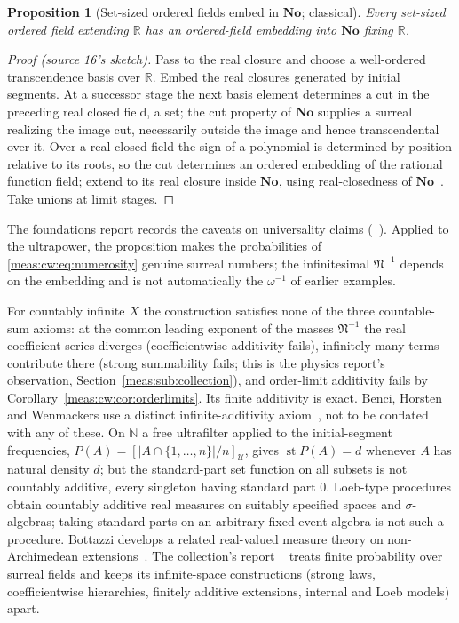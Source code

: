 \documentclass[11pt]{article}
\numberwithin{equation}{section}
\newtheorem{proposition}[theorem]{Proposition}
\theoremstyle{definition}
\theoremstyle{remark}
\newcommand{\R}{\mathbb R}
\newcommand{\N}{\mathbb N}
\newcommand{\No}{\mathbf{No}}
\newcommand{\st}{\operatorname{st}}
\newcommand{\abs}[1]{\lvert#1\rvert}
\begin{document}
\begin{proposition}[Set-sized ordered fields embed in $\No$; classical]
\label{meas:cw:prop:realization}
Every set-sized ordered field extending $\R$ has an ordered-field embedding into
$\No$ fixing $\R$.
\end{proposition}
\begin{proof}[Proof (source 16's sketch)]
Pass to the real closure and choose a well-ordered transcendence basis over $\R$.
Embed the real closures generated by initial segments. At a successor stage the
next basis element determines a cut in the preceding real closed field, a set;
the cut property of $\No$ supplies a surreal realizing the image cut, necessarily
outside the image and hence transcendental over it. Over a real closed field the
sign of a polynomial is determined by position relative to its roots, so the cut
determines an ordered embedding of the rational function field; extend to its
real closure inside $\No$, using real-closedness of $\No$~\cite{Conway,Gonshor}.
Take unions at limit stages.
\end{proof}

The foundations report records the caveats on universality claims
(~\cite{repofound}). Applied to the ultrapower, the
proposition makes the probabilities of \eqref{meas:cw:eq:numerosity} genuine
surreal numbers; the infinitesimal $\mathfrak N^{-1}$ depends on the embedding and
is not automatically the $\omega^{-1}$ of earlier examples.

For countably infinite $X$ the construction satisfies none of the three
countable-sum axioms: at the common leading exponent of the masses
$\mathfrak N^{-1}$ the real coefficient series diverges (coefficientwise additivity
fails), infinitely many terms contribute there (strong summability fails; this
is the physics report's observation, Section~\ref{meas:sub:collection}), and
order-limit additivity fails by Corollary~\ref{meas:cw:cor:orderlimits}. Its finite
additivity is exact. Benci, Horsten and Wenmackers use a distinct
infinite-additivity axiom~\cite{BHW}, not to be conflated with any of these. On
$\N$ a free ultrafilter applied to the initial-segment frequencies,
$P(A)=[\abs{A\cap\{1,\ldots,n\}}/n]_{\mathcal U}$, gives $\st P(A)=d$ whenever $A$
has natural density $d$; but the standard-part set function on all subsets is not
countably additive, every singleton having standard part $0$. Loeb-type
procedures obtain countably additive real measures on suitably specified spaces
and $\sigma$-algebras; taking standard parts on an arbitrary fixed event algebra is
not such a procedure. Bottazzi develops a related real-valued measure theory on
non-Archimedean extensions~\cite{Bottazzi}. The collection's report
~\cite{repofsp} treats finite probability
over surreal fields and keeps its infinite-space constructions (strong laws,
coefficientwise hierarchies, finitely additive extensions, internal and Loeb
models) apart.
\end{document}
